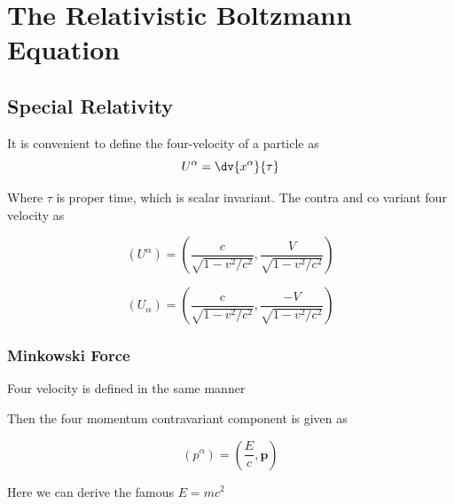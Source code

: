 \chapter{The Relativistic Boltzmann Equation}

\section{Special Relativity}

It is convenient to define the four-velocity of a particle as
\[
U^\alpha = \dv{x^\alpha}{\tau}
  \]

  Where $\tau$ is proper time, which is scalar invariant. The contra and co variant four velocity as

\[
(U^\alpha) = \left(\frac{c}{\sqrt{1-v^2/c^2}}, \frac{V}{\sqrt{1-v^2/c^2}} \right)
  \]

  \[
(U_\alpha) = \left(\frac{c}{\sqrt{1-v^2/c^2}}, \frac{-V}{\sqrt{1-v^2/c^2}} \right)
  \]

\subsection{Minkowski Force}

Four velocity is defined in the same manner

Then the four momentum contravariant component is given as

\[
(p^\alpha) = (\frac{E}{c}, \mathbf{p})
  \]

  Here we can derive the famous $E=mc^2$
